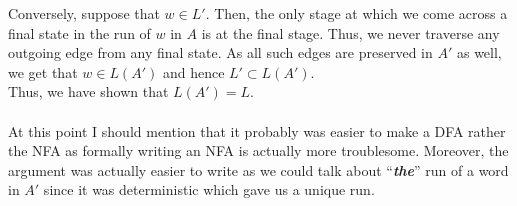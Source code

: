 \documentclass{article}
\begin{document}
\begin{enumerate}[label = \arabic*.]
	Conversely, suppose that $w \in L'.$ Then, the only stage at which we come across a final state in the run of $w$ in $A$ is at the final stage. Thus, we never traverse any outgoing edge from any final state. As all such edges are preserved in $A'$ as well, we get that $w \in L(A')$ and hence $L' \subset L(A').$\\
	Thus, we have shown that $L(A') = L.$\\~\\
	At this point I should mention that it probably was easier to make a DFA rather the NFA as formally writing an NFA is actually more troublesome. Moreover, the argument was actually easier to write as we could talk about ``\textbf{\emph{the}}'' run of a word in $A'$ since it was deterministic which gave us a unique run.
\end{enumerate}
\end{document}
